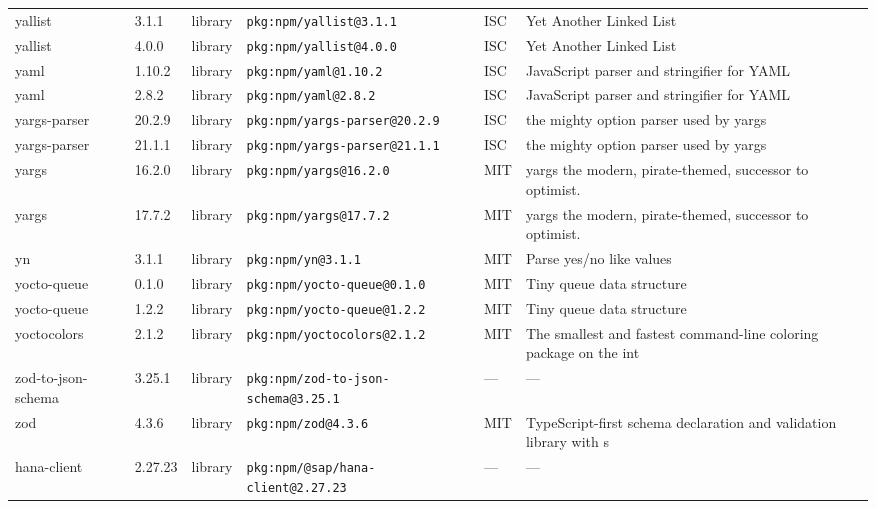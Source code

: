 \documentclass[11pt,a4paper]{article}
\begin{document}
\begin{longtable}{|p{4cm}|p{2cm}|p{1.6cm}|p{5cm}|p{1.5cm}|p{3.5cm}|}
\raggedright yallist & 3.1.1 & library & \small\texttt{pkg:npm/yallist@3.1.1} & ISC & \small Yet Another Linked List \\
\raggedright yallist & 4.0.0 & library & \small\texttt{pkg:npm/yallist@4.0.0} & ISC & \small Yet Another Linked List \\
\raggedright yaml & 1.10.2 & library & \small\texttt{pkg:npm/yaml@1.10.2} & ISC & \small JavaScript parser and stringifier for YAML \\
\raggedright yaml & 2.8.2 & library & \small\texttt{pkg:npm/yaml@2.8.2} & ISC & \small JavaScript parser and stringifier for YAML \\
\raggedright yargs-parser & 20.2.9 & library & \small\texttt{pkg:npm/yargs-parser@20.2.9} & ISC & \small the mighty option parser used by yargs \\
\raggedright yargs-parser & 21.1.1 & library & \small\texttt{pkg:npm/yargs-parser@21.1.1} & ISC & \small the mighty option parser used by yargs \\
\raggedright yargs & 16.2.0 & library & \small\texttt{pkg:npm/yargs@16.2.0} & MIT & \small yargs the modern, pirate-themed, successor to optimist. \\
\raggedright yargs & 17.7.2 & library & \small\texttt{pkg:npm/yargs@17.7.2} & MIT & \small yargs the modern, pirate-themed, successor to optimist. \\
\raggedright yn & 3.1.1 & library & \small\texttt{pkg:npm/yn@3.1.1} & MIT & \small Parse yes/no like values \\
\raggedright yocto-queue & 0.1.0 & library & \small\texttt{pkg:npm/yocto-queue@0.1.0} & MIT & \small Tiny queue data structure \\
\raggedright yocto-queue & 1.2.2 & library & \small\texttt{pkg:npm/yocto-queue@1.2.2} & MIT & \small Tiny queue data structure \\
\raggedright yoctocolors & 2.1.2 & library & \small\texttt{pkg:npm/yoctocolors@2.1.2} & MIT & \small The smallest and fastest command-line coloring package on the int \\
\raggedright zod-to-json-schema & 3.25.1 & library & \small\texttt{pkg:npm/zod-to-json-schema@3.25.1} & — & \small — \\
\raggedright zod & 4.3.6 & library & \small\texttt{pkg:npm/zod@4.3.6} & MIT & \small TypeScript-first schema declaration and validation library with s \\
\raggedright hana-client & 2.27.23 & library & \small\texttt{pkg:npm/@sap/hana-client@2.27.23} & — & \small — \\

\end{longtable}
\end{document}
